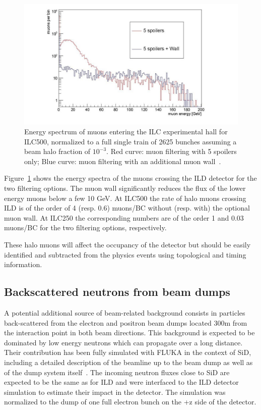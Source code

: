 \begin{figure}[t!]
\includegraphics[width=1.0\hsize]{Integration/fig/BG_muons.jpg}
\caption{\label{fig:integration:muons}Energy spectrum of muons entering the ILC experimental hall for ILC500, normalized to a full single train of 2625 bunches assuming a beam halo fraction of $10^{-3}$. Red curve: muon filtering with 5 spoilers only; Blue curve: muon filtering with an additional muon wall~\cite{ild:bib:schuetz_thesis}.}
\end{figure}

Figure~\ref{fig:integration:muons} shows the energy spectra of the muons crossing the ILD detector for the two filtering options. The muon wall significantly reduces the flux of the lower energy muons below a few 10 GeV. At ILC500 the rate of halo muons crossing ILD is of the order of 4 (resp. 0.6) muons/BC without (resp. with) the optional muon wall. At ILC250 the corresponding numbers are of the order 1 and 0.03 muons/BC for the two filtering options, respectively.

These halo muons will affect the occupancy of the detector but should be easily identified and subtracted from the physics events using topological and timing information.

\subsection{Backscattered neutrons from beam dumps}

A potential additional source of beam-related background consists in particles back-scattered from the electron and positron beam dumps located 300m from the interaction point in both beam directions. This background is expected to be dominated by low energy neutrons which can propagate over a long distance. Their contribution has been fully simulated with FLUKA in the context of SiD, including a detailed description of the beamline up to the beam dump as well as of the dump system itself~\cite{ild:bib:schuetz_thesis}. The incoming neutron fluxes close to SiD are expected to be the same as for ILD and were interfaced to the ILD detector simulation to estimate their impact in the detector. The simulation was normalized to the dump of one full electron bunch on the +z side of the detector.

